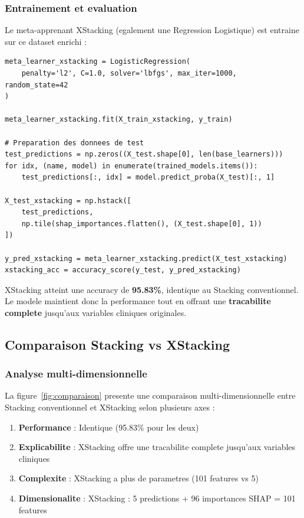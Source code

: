 \subsubsection{Entrainement et evaluation}

Le meta-apprenant XStacking (egalement une Regression Logistique) est entraine sur ce dataset enrichi :

\begin{lstlisting}[style=reportPython, caption={Entrainement du meta-apprenant XStacking}]
meta_learner_xstacking = LogisticRegression(
    penalty='l2', C=1.0, solver='lbfgs', max_iter=1000, random_state=42
)

meta_learner_xstacking.fit(X_train_xstacking, y_train)

# Preparation des donnees de test
test_predictions = np.zeros((X_test.shape[0], len(base_learners)))
for idx, (name, model) in enumerate(trained_models.items()):
    test_predictions[:, idx] = model.predict_proba(X_test)[:, 1]

X_test_xstacking = np.hstack([
    test_predictions,
    np.tile(shap_importances.flatten(), (X_test.shape[0], 1))
])

y_pred_xstacking = meta_learner_xstacking.predict(X_test_xstacking)
xstacking_acc = accuracy_score(y_test, y_pred_xstacking)
\end{lstlisting}

XStacking atteint une accuracy de \textbf{95.83\%}, identique au Stacking conventionnel. Le modele maintient donc la performance tout en offrant une \textbf{tracabilite complete} jusqu'aux variables cliniques originales.

\subsection{Comparaison Stacking vs XStacking}
\label{ssec:cas4-comparaison}

\subsubsection{Analyse multi-dimensionnelle}

La figure~\ref{fig:comparaison} presente une comparaison multi-dimensionnelle entre Stacking conventionnel et XStacking selon plusieurs axes :

\begin{enumerate}
    \item \textbf{Performance} : Identique (95.83\% pour les deux)
    \item \textbf{Explicabilite} : XStacking offre une tracabilite complete jusqu'aux variables cliniques
    \item \textbf{Complexite} : XStacking a plus de parametres (101 features vs 5)
    \item \textbf{Dimensionalite} : XStacking : 5 predictions + 96 importances SHAP = 101 features
\end{enumerate}

